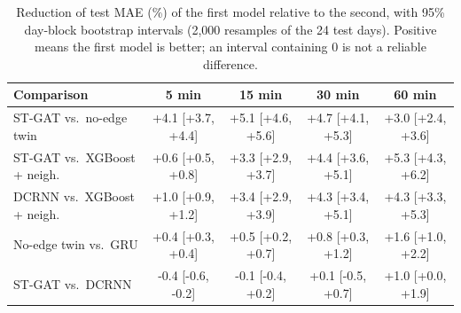\begin{table}[t]
\centering
\caption{Reduction of test MAE (\%) of the first model relative to the second, with 95\% day-block bootstrap intervals (2{,}000 resamples of the 24 test days). Positive means the first model is better; an interval containing 0 is not a reliable difference.}
\label{tab:boot}
\begin{tabular}{@{}lcccc@{}}
\toprule
Comparison & 5 min & 15 min & 30 min & 60 min \\
\midrule
ST-GAT vs.\ no-edge twin & +4.1 [+3.7, +4.4] & +5.1 [+4.6, +5.6] & +4.7 [+4.1, +5.3] & +3.0 [+2.4, +3.6] \\
ST-GAT vs.\ XGBoost + neigh. & +0.6 [+0.5, +0.8] & +3.3 [+2.9, +3.7] & +4.4 [+3.6, +5.1] & +5.3 [+4.3, +6.2] \\
DCRNN vs.\ XGBoost + neigh. & +1.0 [+0.9, +1.2] & +3.4 [+2.9, +3.9] & +4.3 [+3.4, +5.1] & +4.3 [+3.3, +5.3] \\
No-edge twin vs.\ GRU & +0.4 [+0.3, +0.4] & +0.5 [+0.2, +0.7] & +0.8 [+0.3, +1.2] & +1.6 [+1.0, +2.2] \\
ST-GAT vs.\ DCRNN & -0.4 [-0.6, -0.2] & -0.1 [-0.4, +0.2] & +0.1 [-0.5, +0.7] & +1.0 [+0.0, +1.9] \\
\bottomrule
\end{tabular}
\end{table}
